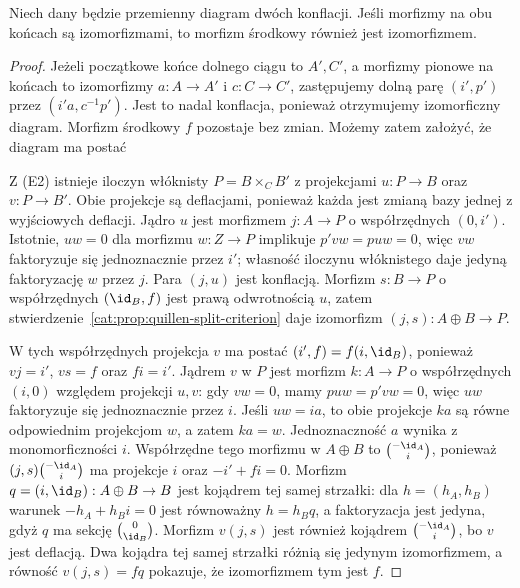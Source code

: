 \begin{twierdzenie}\label{cat:thm:quillen-short-five}
Niech dany będzie przemienny diagram dwóch konflacji. Jeśli morfizmy na obu końcach są izomorfizmami, to morfizm środkowy również jest izomorfizmem.
\end{twierdzenie}
\begin{proof}
Jeżeli początkowe końce dolnego ciągu to $A',C'$, a morfizmy pionowe na końcach to izomorfizmy $a:A\to A'$ i $c:C\to C'$, zastępujemy dolną parę $(i',p')$ przez $(i'a,c^{-1}p')$. Jest to nadal konflacja, ponieważ otrzymujemy izomorficzny diagram. Morfizm środkowy $f$ pozostaje bez zmian. Możemy zatem założyć, że diagram ma postać
\begin{center}
\end{center}
Z (E2) istnieje iloczyn włóknisty $P=B\times_C B'$ z projekcjami $u:P\to B$ oraz $v:P\to B'$. Obie projekcje są deflacjami, ponieważ każda jest zmianą bazy jednej z wyjściowych deflacji. Jądro $u$ jest morfizmem $j:A\to P$ o współrzędnych $(0,i')$. Istotnie, $u w=0$ dla morfizmu $w:Z\to P$ implikuje $p'vw=puw=0$, więc $vw$ faktoryzuje się jednoznacznie przez $i'$; własność iloczynu włóknistego daje jedyną faktoryzację $w$ przez $j$. Para $(j,u)$ jest konflacją. Morfizm $s:B\to P$ o współrzędnych $(\id_B,f)$ jest prawą odwrotnością $u$, zatem stwierdzenie~\ref{cat:prop:quillen-split-criterion} daje izomorfizm $(j,s):A\oplus B\to P$.

W tych współrzędnych projekcja $v$ ma postać $(i',f)=f(i,\id_B)$, ponieważ $vj=i'$, $vs=f$ oraz $fi=i'$. Jądrem $v$ w $P$ jest morfizm $k:A\to P$ o współrzędnych $(i,0)$ względem projekcji $u,v$: gdy $vw=0$, mamy $puw=p'vw=0$, więc $uw$ faktoryzuje się jednoznacznie przez $i$. Jeśli $uw=ia$, to obie projekcje $ka$ są równe odpowiednim projekcjom $w$, a zatem $ka=w$. Jednoznaczność $a$ wynika z monomorficzności $i$. Współrzędne tego morfizmu w $A\oplus B$ to $\binom{-\id_A}{i}$, ponieważ $(j,s)\binom{-\id_A}{i}$ ma projekcje $i$ oraz $-i'+fi=0$. Morfizm $q=(i,\id_B):A\oplus B\to B$ jest kojądrem tej samej strzałki: dla $h=(h_A,h_B)$ warunek $-h_A+h_B i=0$ jest równoważny $h=h_Bq$, a faktoryzacja jest jedyna, gdyż $q$ ma sekcję $\binom{0}{\id_B}$. Morfizm $v(j,s)$ jest również kojądrem $\binom{-\id_A}{i}$, bo $v$ jest deflacją. Dwa kojądra tej samej strzałki różnią się jedynym izomorfizmem, a równość $v(j,s)=fq$ pokazuje, że izomorfizmem tym jest $f$.
\end{proof}

